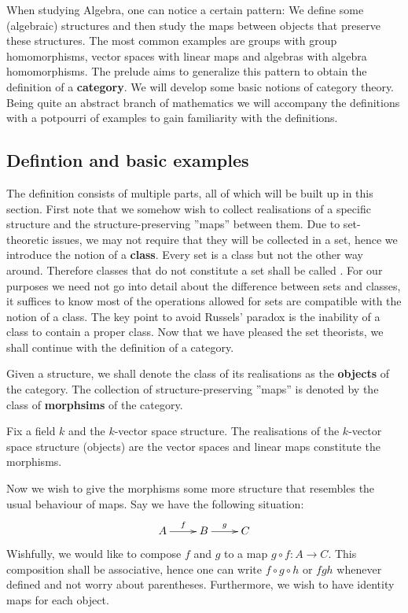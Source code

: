 \documentclass[twoside = false,	%
		headsepline,		%
		parskip = true,
		]{scrbook}						%
\begin{document}
    When studying Algebra, one can notice a certain pattern:
    We define some (algebraic) structures and then study the maps between objects that preserve these structures.
    The most common examples are groups with group homomorphisms, vector spaces with linear maps and algebras with algebra homomorphisms.
    The prelude aims to generalize this pattern to obtain the definition of a \textbf{category}.
    We will develop some basic notions of category theory.
    Being quite an abstract branch of mathematics we will accompany the definitions with a potpourri of examples
    to gain familiarity with the definitions.
    
\subsection{Defintion and basic examples}
   The definition consists of multiple parts, all of which will be built up in this section.
    First note that we somehow wish to collect realisations of a specific structure and
    the structure-preserving ''maps'' between them.
    Due to set-theoretic issues, we may not require that they will be collected in a set,
    hence we introduce the notion of a \textbf{class}. Every set is a class but not the other way around. 
    Therefore classes that do not constitute a set shall be called .
    For our purposes we need not go into detail about the difference between sets and classes,
    it suffices to know most of the operations allowed for sets are compatible with the notion of a class.
    The key point to avoid Russels' paradox is the inability of a class to contain a proper class.
    Now that we have pleased the set theorists, we shall continue with the definition of a category.
    
    Given a structure, we shall denote the class of its realisations as the \textbf{objects} of the category.
    The collection of structure-preserving ''maps'' is denoted by the class of \textbf{morphsims} of the category.

    \begin{example*}{}
        Fix a field $k$ and the $k$-vector space structure.
        The realisations of the $k$-vector space structure (objects) are the vector spaces and
        linear maps constitute the morphisms.
    \end{example*}

    Now we wish to give the morphisms some more structure that resembles the usual behaviour of maps.
    Say we have the following situation:
    \begin{equation*}
        \xymatrix {
            A \ar[r]^{f} & B \ar[r]^g & C
        }
    \end{equation*}
    Wishfully, we would like to compose $f$ and $g$ to a map $g \circ f: A \to C$.
    This composition shall be associative, hence one can write $f \circ g \circ h$ or $fgh$ whenever defined and not worry about parentheses. Furthermore, we wish to have identity maps for each object.
    
\end{document}
